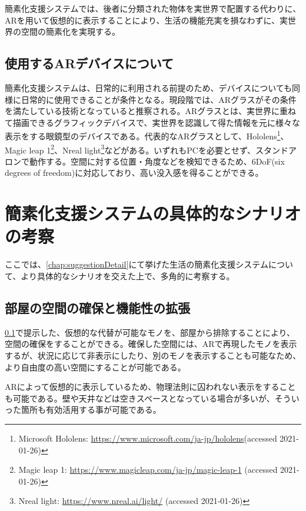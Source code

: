 簡素化支援システムでは、後者に分類された物体を実世界で配置する代わりに、ARを用いて仮想的に表示することにより、生活の機能充実を損なわずに、実世界の空間の簡素化を実現する。

\subsection{使用するARデバイスについて}
\label{chap:ARdevice}

簡素化支援システムは、日常的に利用される前提のため、デバイスについても同様に日常的に使用できることが条件となる。現段階では、ARグラスがその条件を満たしている技術となっていると推察される。ARグラスとは、実世界に重ねて描画できるグラフィックデバイスで、実世界を認識して得た情報を元に様々な表示をする眼鏡型のデバイスである。代表的なARグラスとして、Hololens\footnote{Microsoft Hololens: \url{https://www.microsoft.com/ja-jp/hololens}(accessed 2021-01-26)}、Magic leap 1\footnote{Magic leap 1: \url{https://www.magicleap.com/ja-jp/magic-leap-1} (accessed 2021-01-26)}、Nreal light\footnote{Nreal light: \url{https://www.nreal.ai/light/} (accessed 2021-01-26)}などがある。いずれもPCを必要とせず、スタンドアロンで動作する。空間に対する位置・角度などを検知できるため、6DoF(six degrees of freedom)に対応しており、高い没入感を得ることができる。

\newpage

\section{簡素化支援システムの具体的なシナリオの考察}

ここでは、\ref{chap:suggestionDetail}にて挙げた生活の簡素化支援システムについて、より具体的なシナリオを交えた上で、多角的に考察する。

\subsection{部屋の空間の確保と機能性の拡張}

\ref{chap:ARdevice}で提示した、仮想的な代替が可能なモノを、部屋から排除することにより、空間の確保をすることができる。確保した空間には、ARで再現したモノを表示するが、状況に応じて非表示にしたり、別のモノを表示することも可能なため、より自由度の高い空間にすることが可能である。

ARによって仮想的に表示しているため、物理法則に囚われない表示をすることも可能である。壁や天井などは空きスペースとなっている場合が多いが、そういった箇所も有効活用する事が可能である。

